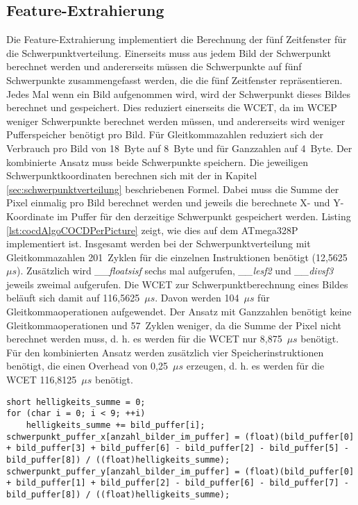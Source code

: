 \subsection{Feature-Extrahierung}
Die Feature-Extrahierung implementiert die Berechnung der fünf Zeitfenster für die Schwerpunktverteilung. Einerseits muss aus jedem Bild der Schwerpunkt berechnet werden und andererseits müssen die Schwerpunkte
auf fünf Schwerpunkte zusammengefasst werden, die die fünf Zeitfenster repräsentieren.
\newline
\newline
Jedes Mal wenn ein Bild aufgenommen wird, wird der Schwerpunkt dieses Bildes berechnet und gespeichert. Dies reduziert einerseits die WCET, da im WCEP weniger Schwerpunkte berechnet werden müssen, und andererseits
wird weniger Pufferspeicher benötigt pro Bild. Für Gleitkommazahlen reduziert sich der Verbrauch pro Bild von 18~Byte auf 8~Byte und für Ganzzahlen auf 4~Byte. Der kombinierte Ansatz muss beide Schwerpunkte speichern.
Die jeweiligen Schwerpunktkoordinaten berechnen sich mit der in Kapitel \ref{sec:schwerpunktverteilung} beschriebenen Formel. Dabei muss die Summe der Pixel einmalig pro Bild berechnet werden und jeweils die
berechnete X- und Y-Koordinate im Puffer für den derzeitige Schwerpunkt gespeichert werden. Listing \ref{lst:cocdAlgoCOCDPerPicture} zeigt, wie dies auf dem ATmega328P implementiert ist. Insgesamt werden bei der
Schwerpunktverteilung mit Gleitkommazahlen 201~Zyklen für die einzelnen Instruktionen benötigt (12,5625~$\mu s$). Zusätzlich wird \textit{\_\_floatsisf} sechs mal aufgerufen, \textit{\_\_lesf2} und \textit{\_\_divsf3}
jeweils zweimal aufgerufen. Die WCET zur Schwerpunktberechnung eines Bildes beläuft sich damit auf 116,5625~$\mu s$. Davon werden 104~$\mu s$ für Gleitkommaoperationen aufgewendet. Der Ansatz mit Ganzzahlen benötigt
keine Gleitkommaoperationen und 57~Zyklen weniger, da die Summe der Pixel nicht berechnet werden muss, d. h. es werden für die WCET nur 8,875~$\mu s$ benötigt. Für den kombinierten Ansatz werden zusätzlich vier
Speicherinstruktionen benötigt, die einen Overhead von 0,25~$\mu s$ erzeugen, d. h. es werden für die WCET 116,8125~$\mu s$ benötigt.
\begin{lstlisting}[label=lst:cocdAlgoCOCDPerPicture,caption={Implementierung um den Schwerpunkt für ein Bild zu berechnen.}]
short helligkeits_summe = 0;
for (char i = 0; i < 9; ++i)
    helligkeits_summe += bild_puffer[i];
schwerpunkt_puffer_x[anzahl_bilder_im_puffer] = (float)(bild_puffer[0] + bild_puffer[3] + bild_puffer[6] - bild_puffer[2] - bild_puffer[5] - bild_puffer[8]) / ((float)helligkeits_summe);
schwerpunkt_puffer_y[anzahl_bilder_im_puffer] = (float)(bild_puffer[0] + bild_puffer[1] + bild_puffer[2] - bild_puffer[6] - bild_puffer[7] - bild_puffer[8]) / ((float)helligkeits_summe);
\end{lstlisting}
